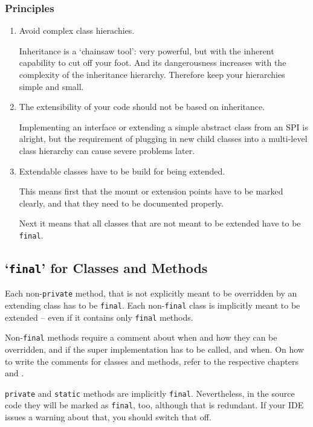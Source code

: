\subsubsection{Principles}
\begin{enumerate}[label=P\arabic*.]
\item{Avoid complex class hierachies.

Inheritance is a ‘chainsaw tool’: very powerful, but with the inherent capability to cut off your foot. And its dangerousness increases with the complexity of the inheritance hierarchy. Therefore keep your hierarchies simple and small.}

\item{The extensibility of your code should not be based on inheritance.

Implementing an interface or extending a simple abstract class from an SPI is alright, but the requirement of plugging in new child classes into a multi-level class hierarchy can cause severe problems later.}

\item{Extendable classes have to be build for being extended.

This means first that the mount or extension points have to be marked clearly, and that they need to be documented properly.

Next it means that all classes that are not meant to be extended have to be \lstinline|final|.}
\end{enumerate}


\subsection{‘\lstinline|final|’ for Classes and Methods}
Each non-\lstinline|private| method, that is not explicitly meant to be overridden by an extending class has to be \lstinline|final|. Each non-\lstinline|final| class is implicitly meant to be extended – even if it contains only \lstinline|final| methods.

Non-\lstinline|final| methods require a comment about when and how they can be overridden, and if the super implementation has to be called, and when. On how to write the comments for classes and methods, refer to the respective chapters  and .

\lstinline|private| and \lstinline|static| methods are implicitly \lstinline|final|. Nevertheless, in the source code they will be marked as \lstinline|final|, too, although that is redundant. If your IDE issues a warning about that, you should switch that off.

